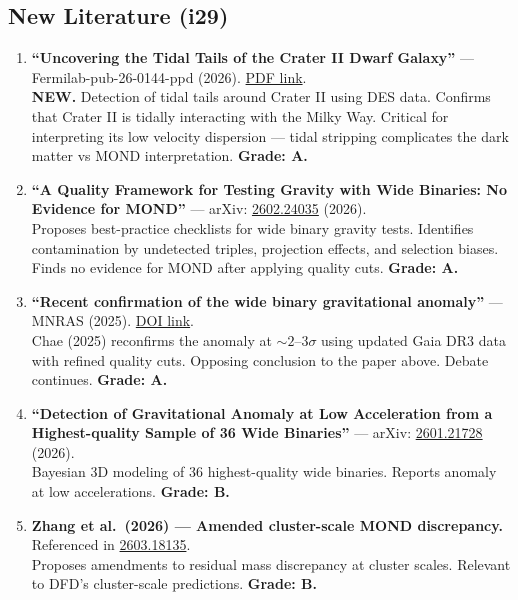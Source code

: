 \documentclass[11pt,a4paper]{article}
\begin{document}
\subsection{New Literature (i29)}

\begin{enumerate}
\item \textbf{``Uncovering the Tidal Tails of the Crater II Dwarf Galaxy''} --- Fermilab-pub-26-0144-ppd (2026). \href{https://lss.fnal.gov/archive/2026/pub/fermilab-pub-26-0144-ppd.pdf}{PDF link}.\\
\textbf{NEW.} Detection of tidal tails around Crater II using DES data. Confirms that Crater II is tidally interacting with the Milky Way. Critical for interpreting its low velocity dispersion --- tidal stripping complicates the dark matter vs MOND interpretation. \textbf{Grade: A.}

\item \textbf{``A Quality Framework for Testing Gravity with Wide Binaries: No Evidence for MOND''} --- arXiv: \href{https://arxiv.org/abs/2602.24035}{2602.24035} (2026).\\
Proposes best-practice checklists for wide binary gravity tests. Identifies contamination by undetected triples, projection effects, and selection biases. Finds no evidence for MOND after applying quality cuts. \textbf{Grade: A.}

\item \textbf{``Recent confirmation of the wide binary gravitational anomaly''} --- MNRAS (2025). \href{https://doi.org/10.1093/mnras/staf210}{DOI link}.\\
Chae (2025) reconfirms the anomaly at $\sim 2$--$3\sigma$ using updated Gaia DR3 data with refined quality cuts. Opposing conclusion to the paper above. Debate continues. \textbf{Grade: A.}

\item \textbf{``Detection of Gravitational Anomaly at Low Acceleration from a Highest-quality Sample of 36 Wide Binaries''} --- arXiv: \href{https://arxiv.org/abs/2601.21728}{2601.21728} (2026).\\
Bayesian 3D modeling of 36 highest-quality wide binaries. Reports anomaly at low accelerations. \textbf{Grade: B.}

\item \textbf{Zhang et al.\ (2026) --- Amended cluster-scale MOND discrepancy.} Referenced in \href{https://arxiv.org/abs/2603.18135}{2603.18135}.\\
Proposes amendments to residual mass discrepancy at cluster scales. Relevant to DFD's cluster-scale predictions. \textbf{Grade: B.}
\end{enumerate}
\end{document}
